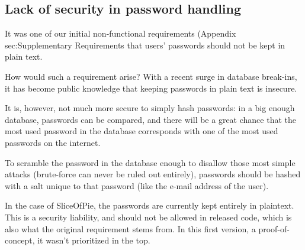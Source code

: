 \subsection{Lack of security in password handling}

It was one of our initial non-functional requirements (Appendix {sec:Supplementary Requirements} that
users' passwords should not be kept in plain text.

How would such a requirement arise? With a recent surge in database break-ins\cite{lulzsec0711}, it has
become public knowledge that keeping passwords in plain text is insecure.

It is, however, not much more secure to simply hash passwords: in a big enough database, passwords can be
compared, and there will be a great chance that the most used password in the database corresponds with one
of the most used passwords on the internet\cite{toppasswords}.

To scramble the password in the database enough to disallow those most simple attacks (brute-force can never
be ruled out entirely), passwords should be hashed with a salt unique to that password (like the e-mail address
of the user).

In the case of SliceOfPie, the passwords are currently kept entirely in plaintext. This is a security liability,
and should not be allowed in released code, which is also what the original requirement stems from. In this first
version, a proof-of-concept, it wasn't prioritized in the top.